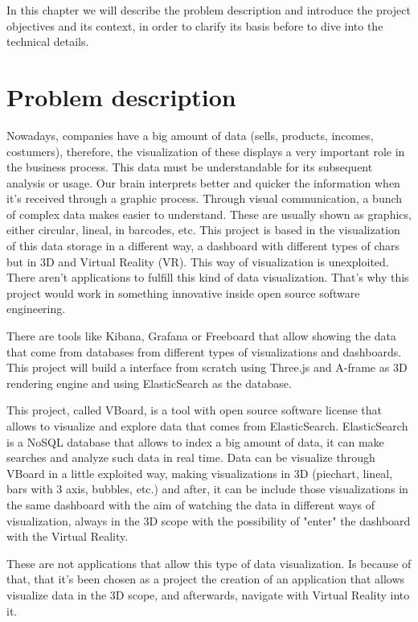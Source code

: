 \documentclass[a4paper, 12pt]{book}
\begin{document}
In this chapter we will describe the problem description and introduce the project objectives and its context, in order to clarify its basis before to dive into the technical details.

\section{Problem description}
\label{sec:probdescr}

Nowadays, companies have a big amount of data (sells, products, incomes, costumers), therefore, the visualization of these displays a very important role in the business process. This data must be understandable for its subsequent analysis or usage. Our brain interprets better and quicker the information when it's received through a graphic process. Through visual communication, a bunch of complex data makes easier to understand. These are usually shown as graphics, either circular, lineal, in barcodes, etc. This project is based in the visualization of this data storage in a different way, a dashboard with different types of chars but in 3D and Virtual Reality (VR). This way of visualization is unexploited. There aren't applications to fulfill this kind of data visualization. That's why this project would work in something innovative inside open source software engineering.

There are tools like Kibana, Grafana or Freeboard that allow showing the data that come from databases from different types of visualizations and dashboards. This project will build a interface from scratch using Three.js and A-frame as 3D rendering engine and using ElasticSearch as the database.

This project, called VBoard, is a tool with open source software license that allows to visualize and explore data that comes from ElasticSearch. ElasticSearch is a NoSQL database that allows to index a big amount of data, it can make searches and analyze such data in real time. Data can be visualize through VBoard in a little exploited way, making visualizations in 3D (piechart, lineal, bars with 3 axis, bubbles, etc.) and after, it can be include those visualizations in the same dashboard with the aim of watching the data in different ways of visualization, always in the 3D scope with the possibility of "enter" the dashboard with the Virtual Reality.

These are not applications that allow this type of data visualization. Is because of that, that it's been chosen as a project the creation of an application that allows visualize data in the 3D scope, and afterwards, navigate with Virtual Reality into it.
\end{document}
